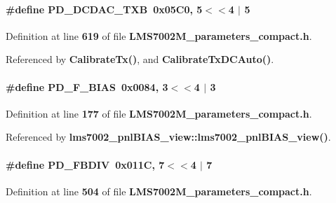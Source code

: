 \paragraph[{P\+D\+\_\+\+D\+C\+D\+A\+C\+\_\+\+T\+XB}]{\setlength{\rightskip}{0pt plus 5cm}\#define P\+D\+\_\+\+D\+C\+D\+A\+C\+\_\+\+T\+XB~0x05\+C0, 5$<$$<$4 $\vert$ 5}\label{LMS7002M__parameters__compact_8h_adedeed266a0f6bc15d2ac5612a1ba407}


Definition at line {\bf 619} of file {\bf L\+M\+S7002\+M\+\_\+parameters\+\_\+compact.\+h}.



Referenced by {\bf Calibrate\+Tx()}, and {\bf Calibrate\+Tx\+D\+C\+Auto()}.

\paragraph[{P\+D\+\_\+\+F\+\_\+\+B\+I\+AS}]{\setlength{\rightskip}{0pt plus 5cm}\#define P\+D\+\_\+\+F\+\_\+\+B\+I\+AS~0x0084, 3$<$$<$4 $\vert$  3}\label{LMS7002M__parameters__compact_8h_a8329ed3a4706801e4d1f9695ce6d8742}


Definition at line {\bf 177} of file {\bf L\+M\+S7002\+M\+\_\+parameters\+\_\+compact.\+h}.



Referenced by {\bf lms7002\+\_\+pnl\+B\+I\+A\+S\+\_\+view\+::lms7002\+\_\+pnl\+B\+I\+A\+S\+\_\+view()}.

\paragraph[{P\+D\+\_\+\+F\+B\+D\+IV}]{\setlength{\rightskip}{0pt plus 5cm}\#define P\+D\+\_\+\+F\+B\+D\+IV~0x011\+C, 7$<$$<$4 $\vert$  7}\label{LMS7002M__parameters__compact_8h_aaea63d96f1414567068034c70fac55cd}


Definition at line {\bf 504} of file {\bf L\+M\+S7002\+M\+\_\+parameters\+\_\+compact.\+h}.



